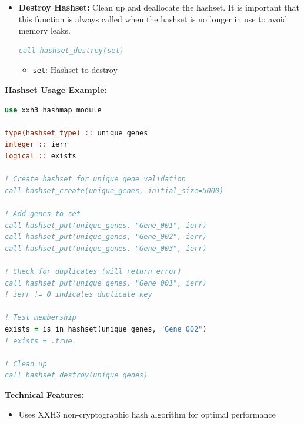 \begin{enumerate}
\begin{enumerate}
\begin{itemize}
\begin{itemize}
                            \item \texttt{key}: String key to check
                                  
                            \item \textbf{Returns:} Logical indicating membership
                          \end{itemize}
                          
                    \item \textbf{Destroy Hashset:} Clean up and deallocate the hashset.
                          It is important that this function is always called when the hashset
                          is no longer in use to avoid memory leaks.
                          \begin{lstlisting}[language=Fortran]
call hashset_destroy(set)
                          \end{lstlisting}
                          \begin{itemize}
                            \item \texttt{set}: Hashset to destroy
                          \end{itemize}
                  \end{itemize}
                  
                  \textbf{Hashset Usage Example:}
                  \begin{lstlisting}[language=Fortran]
use xxh3_hashmap_module

type(hashset_type) :: unique_genes
integer :: ierr
logical :: exists

! Create hashset for unique gene validation
call hashset_create(unique_genes, initial_size=5000)

! Add genes to set
call hashset_put(unique_genes, "Gene_001", ierr)
call hashset_put(unique_genes, "Gene_002", ierr)
call hashset_put(unique_genes, "Gene_003", ierr)

! Check for duplicates (will return error)
call hashset_put(unique_genes, "Gene_001", ierr)
! ierr != 0 indicates duplicate key

! Test membership
exists = is_in_hashset(unique_genes, "Gene_002")
! exists = .true.

! Clean up
call hashset_destroy(unique_genes)
                  \end{lstlisting}
          \end{enumerate}
          
          \textbf{Technical Features:}
          \begin{itemize}
            \item Uses XXH3 non-cryptographic hash algorithm for optimal performance
                  

\end{itemize}
\end{enumerate}
